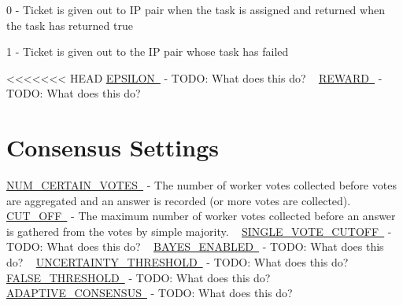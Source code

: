 \begin{DoxyItemize}
\item 0 -\/ Ticket is given out to IP pair when the task is assigned and returned when the task has returned true
\item 1 -\/ Ticket is given out to the IP pair whose task has failed
\end{DoxyItemize}

<<<<<<< HEAD
\mbox{\hyperlink{namespacedynamicfilterapp_1_1toggles_a5f5369d7244632ac071379fbb460c8fe}{E\+P\+S\+I\+L\+ON }} -\/ T\+O\+DO\+: What does this do? ~\newline
 \mbox{\hyperlink{namespacedynamicfilterapp_1_1toggles_a058a8495c920cb75e731931532524c19}{R\+E\+W\+A\+RD }} -\/ T\+O\+DO\+: What does this do? ~\newline
 \hypertarget{toggles_voteGetting}{}\section{Consensus Settings}\label{toggles_voteGetting}
\mbox{\hyperlink{namespacedynamicfilterapp_1_1toggles_a157bc167f366f75c9ba8d3e36e8d8540}{N\+U\+M\+\_\+\+C\+E\+R\+T\+A\+I\+N\+\_\+\+V\+O\+T\+ES }} -\/ The number of worker votes collected before votes are aggregated and an answer is recorded (or more votes are collected). ~\newline
 \mbox{\hyperlink{namespacedynamicfilterapp_1_1toggles_a914791c176a78c026dc76a18bcd88d73}{C\+U\+T\+\_\+\+O\+FF }} -\/ The maximum number of worker votes collected before an answer is gathered from the votes by simple majority. ~\newline
 \mbox{\hyperlink{namespacedynamicfilterapp_1_1toggles_afa8e106b735033b706b1412e12f6783b}{S\+I\+N\+G\+L\+E\+\_\+\+V\+O\+T\+E\+\_\+\+C\+U\+T\+O\+FF }} -\/ T\+O\+DO\+: What does this do? ~\newline
 \mbox{\hyperlink{namespacedynamicfilterapp_1_1toggles_adadcb301c2f0066591eaf0a4c08ac96d}{B\+A\+Y\+E\+S\+\_\+\+E\+N\+A\+B\+L\+ED }} -\/ T\+O\+DO\+: What does this do? ~\newline
 \mbox{\hyperlink{namespacedynamicfilterapp_1_1toggles_aaefdc27b85545eb4a910f5c65f7d8bbb}{U\+N\+C\+E\+R\+T\+A\+I\+N\+T\+Y\+\_\+\+T\+H\+R\+E\+S\+H\+O\+LD }} -\/ T\+O\+DO\+: What does this do? ~\newline
 \mbox{\hyperlink{namespacedynamicfilterapp_1_1toggles_a31317fa26792fa204392549329cc31cb}{F\+A\+L\+S\+E\+\_\+\+T\+H\+R\+E\+S\+H\+O\+LD }} -\/ T\+O\+DO\+: What does this do? ~\newline
 \mbox{\hyperlink{namespacedynamicfilterapp_1_1toggles_a7b6800fe9bb5df8c84060ed96d9711ac}{A\+D\+A\+P\+T\+I\+V\+E\+\_\+\+C\+O\+N\+S\+E\+N\+S\+US }} -\/ T\+O\+DO\+: What does this do? ~\newline

